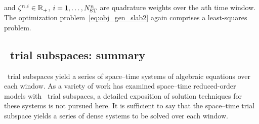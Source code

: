  and $\zeta^{n,i} \in \mathbb{R}^{}_{+}$, $i=1,\ldots,N_{\text{ST}}^{n}$ are quadrature
weights over the $n$th time window. The optimization problem~\eqref{eq:obj_gen_slab2} again comprises a least-squares problem.
\subsection{\spaceTimeAcronym\ trial subspaces: summary}
\spaceTimeAcronym\ trial subspaces yield a series of space--time systems of algebraic equations over each window. As a variety of work has examined space--time reduced-order models with \spaceTimeAcronym\ trial subspaces, 
a detailed exposition of solution techniques for these systems is not pursued here. It is sufficient to say that the 
space--time trial subspace yields a series of dense systems to be solved over each window.
